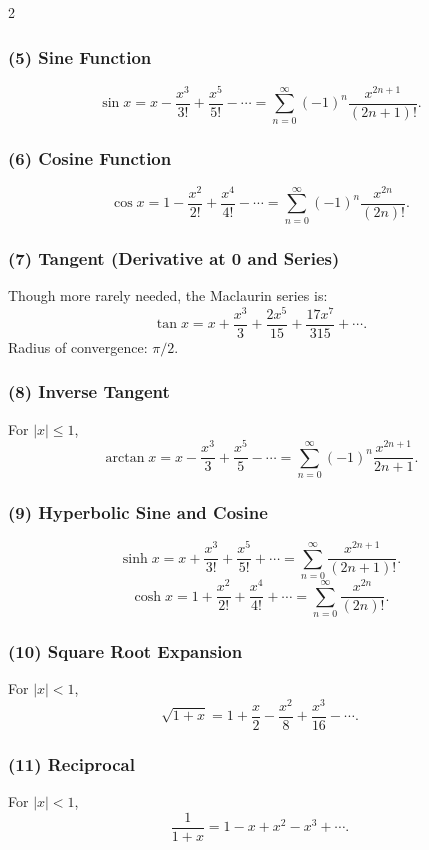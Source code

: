 \documentclass[8pt]{extarticle}
\theoremstyle{definition}
\begin{document}
\begin{multicols*}{2}
\subsubsection*{(5) Sine Function}
\[
\sin x
= x - \frac{x^3}{3!} + \frac{x^5}{5!} - \cdots
= \sum_{n=0}^{\infty} (-1)^n \frac{x^{2n+1}}{(2n+1)!}.
\]

\subsubsection*{(6) Cosine Function}
\[
\cos x
= 1 - \frac{x^2}{2!} + \frac{x^4}{4!} - \cdots
= \sum_{n=0}^{\infty} (-1)^n \frac{x^{2n}}{(2n)!}.
\]

\subsubsection*{(7) Tangent (Derivative at 0 and Series)}
Though more rarely needed, the Maclaurin series is:
\[
\tan x
= x + \frac{x^3}{3} + \frac{2x^5}{15} + \frac{17x^7}{315} + \cdots.
\]
Radius of convergence: \(\pi/2\).

\subsubsection*{(8) Inverse Tangent}
For \(|x|\le 1\),
\[
\arctan x
    = x - \frac{x^3}{3} + \frac{x^5}{5} - \cdots
    = \sum_{n=0}^{\infty} (-1)^n \frac{x^{2n+1}}{2n+1}.
\]

\subsubsection*{(9) Hyperbolic Sine and Cosine}
\[
\sinh x = x + \frac{x^3}{3!} + \frac{x^5}{5!} + \cdots
= \sum_{n=0}^\infty \frac{x^{2n+1}}{(2n+1)!}.
\]
\[
\cosh x = 1 + \frac{x^2}{2!} + \frac{x^4}{4!} + \cdots
= \sum_{n=0}^\infty \frac{x^{2n}}{(2n)!}.
\]

\subsubsection*{(10) Square Root Expansion}
For \(|x|<1\),
\[
\sqrt{1+x}
    = 1 + \frac{x}{2} - \frac{x^2}{8} + \frac{x^3}{16} - \cdots.
\]

\subsubsection*{(11) Reciprocal}
For \(|x|<1\),
\[
\frac{1}{1+x}
    = 1 - x + x^2 - x^3 + \cdots.
\]


\end{multicols*}
\end{document}
